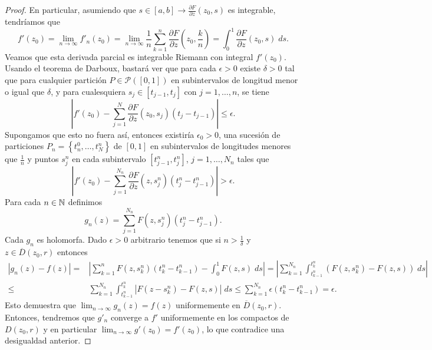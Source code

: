 \begin{proof}
En particular, asumiendo que $\displaystyle s \in \left[a,b\right] \to \frac{\partial F}{\partial z}\left(z_{0}, s\right) $ es integrable, tendríamos que 
\[f'\left(z_{0}\right)=\lim_{n \to \infty}f'_{n}\left(z_{0}\right)=\lim_{n \to \infty}\frac{1}{n}\sum^{n}_{k = 1}\frac{\partial F}{\partial z}\left(z_{0}, \frac{k}{n}\right)=\int^{1}_{0} \frac{\partial F}{\partial z}\left(z_{0}, s\right) \; d s .\]
Veamos que esta derivada parcial es integrable Riemann con integral $\displaystyle f'\left(z_{0}\right) $. Usando el teorema de Darboux, bastará ver que para cada $\displaystyle \epsilon > 0 $ existe $\displaystyle \delta > 0 $ tal que para cualquier partición $\displaystyle P \in \mathcal{P}\left(\left[0,1\right] \right) $ en subintervalos de longitud menor o igual que $\displaystyle \delta  $, y para cualesquiera $\displaystyle s_{j}\in \left[t_{j-1}, t_{j}\right]  $ con $\displaystyle j = 1, \ldots, n $, se tiene 
\[ \left|f'\left(z_{0}\right)-\sum^{N}_{j = 1}\frac{\partial F}{\partial z}\left(z_{0}, s_{j}\right)\left(t_{j}-t_{j-1}\right)\right|\leq \epsilon  .\]
Supongamos que esto no fuera así, entonces existiría $\displaystyle \epsilon _{0} > 0 $, una sucesión de particiones $\displaystyle P_{n} = \left\{ t_{n}^{0}, \ldots, t_{N}^{n}\right\} $ de $\displaystyle \left[0,1\right]  $ en subintervalos de longitudes menores que $\displaystyle \frac{1}{n} $ y puntos $\displaystyle s^{n}_{j} $ en cada subintervalo $\displaystyle \left[t ^{n}_{j-1}, t_{j}^{n}\right]  $, $\displaystyle j = 1, \ldots, N_{n} $ tales que 
\[ \left|f'\left(z_{0}\right)-\sum^{N_{n}}_{j = 1}\frac{\partial F}{\partial z}\left(z, s^{n}_{j}\right)\left(t_{j}^{n}-t_{j-1}^{n}\right)\right| > \epsilon  .\]
Para cada $\displaystyle n \in \mathbb{N} $ definimos 
\[g_{n}\left(z\right)= \sum^{N_{n}}_{ j= 1}F\left(z, s^{n}_{j}\right)\left(t_{j}^{n}-t_{j-1}^{n}\right).\]
Cada $\displaystyle g_{n} $ es holomorfa. Dado $\displaystyle \epsilon > 0 $ arbitrario tenemos que si $\displaystyle n > \frac{1}{\delta } $ y $\displaystyle z \in \overline{D}\left(z_{0}, r\right) $ entonces
\[
\begin{split}
	\left|g_{n}\left(z\right)-f\left(z\right)\right|= & \left|\sum^{n}_{k = 1}F\left(z, s_{k}^{n}\right)\left(t_{k}^{n}-t_{k-1}^{n}\right)-\int^{1}_{0} F\left(z,s\right) \; d s \right| = \left|\sum^{N_{n}}_{k = 1}\int^{t_{k}^{n}}_{t_{k - 1}^{n}} \left(F\left(z, s^{n}_{k}\right)-F\left(z,s\right)\right) \; d s\right| \\
	\leq & \sum^{N_{n}}_{k = 1}\int^{t_{k}^{n}}_{t_{k-1}^{n}} \left|F\left(z-s^{n}_{k}\right)-F\left(z,s\right)\right| \; d s \leq \sum^{N_{n}}_{k = 1}\epsilon \left(t_{k}^{n}-t_{k-1}^{n}\right)=\epsilon .
\end{split}
\]
Esto demuestra que $\displaystyle \lim_{n \to \infty}g_{n}\left(z\right)=f\left(z\right) $ uniformemente en $\displaystyle \overline{D}\left(z_{0}, r\right) $. Entonces, tendremos que $\displaystyle g'_{n} $ converge a $\displaystyle f' $ uniformemente en los compactos de $\displaystyle D\left(z_{0}, r\right) $ y en particular $\displaystyle \lim_{n \to \infty}g'\left(z_{0}\right) = f'\left(z_{0}\right) $, lo que contradice una desigualdad anterior. 
\end{proof}
